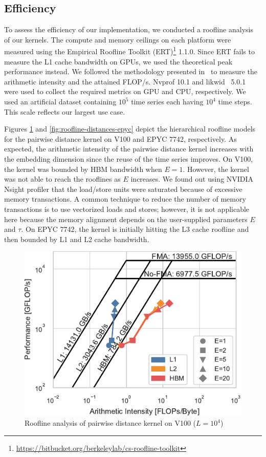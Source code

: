 \documentclass[sigconf]{acmart}
\begin{document}
\subsection{Efficiency}

To assess the efficiency of our implementation, we conducted a roofline
analysis~\cite{Williams2008} of our kernels. The compute and memory ceilings
on each platform were measured using the Empirical Roofline Toolkit (ERT)\footnote{\url{https://bitbucket.org/berkeleylab/cs-roofline-toolkit}} 1.1.0.
Since ERT fails to measure the L1 cache bandwidth on GPUs, we used the
theoretical peak performance instead. We followed the methodology presented
in~\cite{Yang2020a,Yang2020b} to measure the arithmetic intensity and the
attained FLOP/s. Nvprof 10.1 and likwid~\cite{Treibig2010} 5.0.1 were used to
collect the required metrics on GPU and CPU, respectively.
We used an artificial dataset containing $10^5$ time series each having $10^4$
time steps. This scale reflects our largest use case.


Figures \ref{fig:roofline-distances-v100} and \ref{fig:roofline-distances-epyc}
depict the hierarchical roofline models for the pairwise distance kernel on V100
and EPYC 7742, respectively. As expected, the arithmetic intensity of the
pairwise distance kernel increases with the embedding dimension since the
reuse of the time series improves. On V100, the kernel was bounded by HBM
bandwidth when $E=1$. However, the kernel was not able to reach the rooflines
as $E$ increases. We found out using NVIDIA Nsight profiler that the load/store
units were saturated because of excessive memory transactions. A common
technique to reduce the number of memory transactions is to use vectorized
loads and stores; however, it is not applicable here because the memory
alignment depends on the user-supplied parameters $E$ and $\tau$. On EPYC 7742,
the kernel is initially hitting the L3 cache roofline and then bounded by
L1 and L2 cache bandwidth.

\begin{figure}
    \centering
    \includegraphics[width=.9\linewidth]{figs/roofline_distances_v100}
    \caption{Roofline analysis of pairwise distance kernel on V100 ($L=10^4$)}%
    \label{fig:roofline-distances-v100}
\end{figure}
\end{document}
